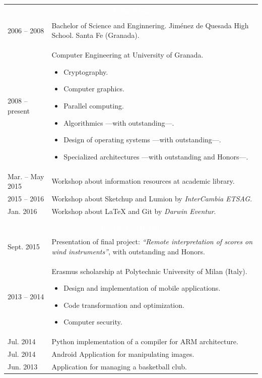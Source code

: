 \documentclass[12pt,a4paper]{article}
\newcommand{\header}[1]{\multicolumn{2}{c}{\cellcolor{black} \textcolor{white} {#1}} \\}
\begin{document}
	\begin{longtable}{p{}p{}}
		\\
		\header{\textbf{Education}}
		\\
		2006 -- 2008 & Bachelor of Science and Enginnering. \newline
		Jiménez de Quesada High School. Santa Fe (Granada). \\
		2008 -- present & Computer Engineering at University of Granada.
		\begin{itemize} \itemsep 0pt \parskip 0pt
			\item Cryptography.
			\item Computer graphics.
			\item Parallel computing.
			\item Algorithmics ---with outstanding---.
			\item Design of operating systems ---with outstanding---.
			\item Specialized architectures ---with outstanding and Honors---.
		\end{itemize} \\
		Mar. -- May 2015 & Workshop about information resources at academic library. \\
		2015 -- 2016 & Workshop about Sketchup and Lumion by \textit{InterCambia 
		ETSAG}. \\
		Jan. 2016 & Workshop about LaTeX and Git by \textit{Darwin Eventur}. \\
		\\
		\header{\textbf{University experience}}
		\\
		Sept. 2015 & Presentation of final project: \textit{``Remote 
		interpretation of scores on wind instruments''}, with outstanding and 
		Honors. \\
		2013 -- 2014 & Erasmus scholarship at Polytechnic University of Milan
		(Italy).
		\begin{itemize} \itemsep 0pt \parskip 0pt
			\item Design and implementation of mobile applications.
			\item Code transformation and optimization.
			\item Computer security.
		\end{itemize} \\
		Jul. 2014 & Python implementation of a compiler for ARM architecture. \\
		Jul. 2014 & Android Application for manipulating images. \\
		Jun. 2013 & Application for managing a basketball club. \\

\end{longtable}
\end{document}
